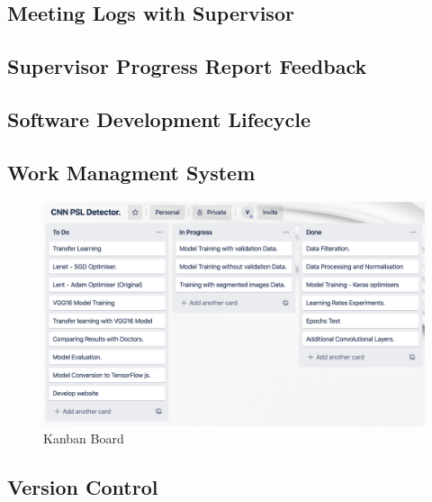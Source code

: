 \subsection*{Meeting Logs with Supervisor}
\subsection*{Supervisor Progress Report Feedback}
\subsection*{Software Development Lifecycle}
\subsection*{Work Managment System}
\begin{figure}[!htp]
    \centering
    \includegraphics[width=15cm]{Images/Kanban Bords.png}
    \caption{Kanban Board}
\end{figure}
\subsection*{Version Control}



